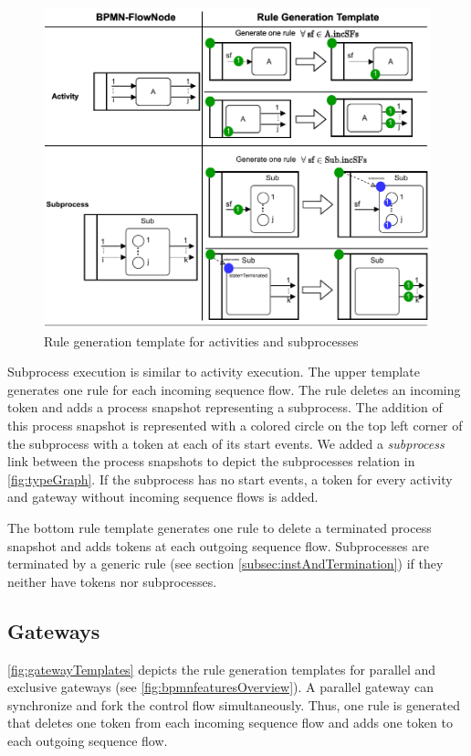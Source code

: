 \documentclass[runningheads]{llncs}
\begin{document}
\begin{figure}[ht]
    \centering
    \includegraphics[width=1\textwidth]{images/activities_template.pdf}
    \caption{Rule generation template for activities and subprocesses}
    \label{fig:activityTemplates}
\end{figure}

Subprocess execution is similar to activity execution.
The upper template generates one rule for each incoming sequence flow.
The rule deletes an incoming token and adds a process snapshot representing a subprocess. 
The addition of this process snapshot is represented with a colored circle on the top left corner of the subprocess with a token at each of its start events.
We added a \textit{subprocess} link between the process snapshots to depict the \textsf{subprocesses} relation in \autoref{fig:typeGraph}.
If the subprocess has no start events, a token for every activity and gateway without incoming sequence flows is added. %

The bottom rule template generates one rule to delete a terminated process snapshot and adds tokens at each outgoing sequence flow.
Subprocesses are terminated by a generic rule (see section \ref{subsec:instAndTermination}) if they neither have tokens nor subprocesses.


\subsection{Gateways}
\autoref{fig:gatewayTemplates} depicts the rule generation templates for parallel and exclusive gateways (see \autoref{fig:bpmnfeaturesOverview}).
A parallel gateway can synchronize and fork the control flow simultaneously.
Thus, one rule is generated that deletes one token from each incoming sequence flow and adds one token to each outgoing sequence flow.
\end{document}
